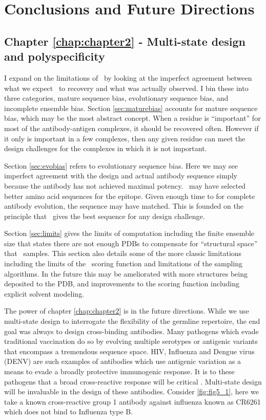 \chapter{Conclusions and Future Directions}
\label{chap:chapter5}
\section{Chapter \ref{chap:chapter2} - Multi-state design and polyspecificity}
I expand on the limitations of \rosettadesign~by looking at the imperfect agreement between what we expect \rosettadesign~to recovery and what was actually observed. I bin these into three categories, mature sequence bias, evolutionary sequence bias, and incomplete ensemble bias. Section \ref{sec:maturebias} accounts for mature sequence bias, which may be the most abstract concept. When a residue is ``important'' for most of the antibody-antigen complexes, it should be recovered often. However if it only is important in a few complexes, then any given residue can meet the design challenges for the complexes in which it is not important.

Section \ref{sec:evobias} refers to evolutionary sequence bias. Here we may see imperfect agreement with the design and actual antibody sequence simply because the antibody has not achieved maximal potency. \rosettadesign~may have selected better amino acid sequences for the epitope. Given enough time to for complete antibody evolution, the sequence may have matched. This is founded on the principle that \rosettadesign~gives the best sequence for any design challenge.

Section \ref{sec:limits} gives the limits of computation including the finite ensemble size that states there are not enough PDBs to compensate for ``structural space'' that \rosettadesign~samples. This section also details some of the more classic limitations including the limits of the \rosetta~scoring function and limitations of the sampling algorithms. In the future this may be ameliorated with more structures being deposited to the PDB, and improvements to the scoring function including explicit solvent modeling.

The power of chapter \ref{chap:chapter2} is in the future directions. While we use multi-state design to interrogate the flexibility of the germline repertoire, the end goal was always to design cross-binding antibodies. Many pathogens which evade traditional vaccination do so by evolving multiple serotypes or antigenic variants that encompass a tremendous sequence space. HIV, Influenza and Dengue virus (DENV) are such examples of antibodies which use antigenic variation as a means to evade a broadly protective immunogenic response. It is to these pathogens that a broad cross-reactive response will be critical \citep{Corti:2013ex,Lanzavecchia:2009dd,Corti:2011ku,Simonelli:2013jc}. Multi-state design will be invaluable in the design of these antibodies. Consider \ref{fig:fig5_1}, here we take a known cross-reactive group 1 antibody against influenza known as CR6261 \citep{Throsby:2008dc} which does not bind to Influenza type B.

